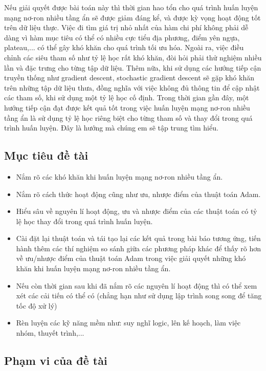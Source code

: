 \documentclass{article}[14pt]
\begin{document}
{   Nếu giải quyết được bài toán này thì thời gian hao tổn cho quá trình huấn luyện mạng nơ-ron nhiều tầng ẩn sẽ được giảm đáng kể, và được kỳ vọng hoạt động tốt trên dữ liệu thực. Việc đi tìm giá trị nhỏ nhất của hàm chi phí không phải dễ dàng vì hàm mục tiêu có thể có nhiều cực tiểu địa phương, điểm yên ngựa, plateau,... có thể gây khó khăn cho quá trình tối ưu hóa. Ngoài ra, việc điều chỉnh các siêu tham số như tỷ lệ học rất khó khăn, đòi hỏi phải thử nghiệm nhiều lần và đặc trưng cho từng tập dữ liệu. Thêm nữa, khi sử dụng các hướng tiếp cận truyền thống như gradient descent, stochastic gradient descent sẽ gặp khó khăn trên những tập dữ liệu thưa, đồng nghĩa với việc không đủ thông tin để cập nhật các tham số, khi sử dụng một tỷ lệ học cố định.
   Trong thời gian gần đây, một hướng tiếp cận đạt được kết quả tốt trong việc huấn luyện mạng nơ-ron nhiều tầng ẩn là sử dụng tỷ lệ học riêng biệt cho từng tham số và thay đổi trong quá trình huấn luyện. Đây là hướng mà chúng em sẽ tập trung tìm hiểu.
    
    \subsection{Mục tiêu đề tài}
    
    \begin{itemize}
        \item Nắm rõ các khó khăn khi huấn luyện mạng nơ-ron nhiều tầng ẩn.
        \item Nắm rõ cách thức hoạt động cũng như ưu, nhược điểm của thuật toán Adam.
        \item Hiểu sâu về nguyên lí hoạt động, ưu và nhược điểm của các thuật toán có tỷ lệ học thay đổi trong quá trình huấn luyện.
        \item Cài đặt lại thuật toán và tái tạo lại các kết quả trong bài báo tương ứng, tiến hành thêm các thí nghiệm so sánh giữa các phương pháp khác để thấy rõ hơn về ưu/nhược điểm của thuật toán Adam trong việc giải quyết những khó khăn khi huấn luyện mạng nơ-ron nhiều tầng ẩn.
        \item Nếu còn thời gian sau khi đã nắm rõ các nguyên lí hoạt động thì có thể xem xét các cải tiến có thể có (chẳng hạn như sử dụng lập trình song song để tăng tốc độ xử lý)
        \item Rèn luyện các kỹ năng mềm như: suy nghĩ logic, lên kế hoạch, làm việc nhóm, thuyết trình,...
    \end{itemize}
    
    \subsection{Phạm vi của đề tài}
    
}
\end{document}
